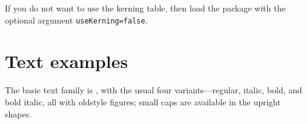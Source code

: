 \documentclass[11pt]{article}
\begin{document}
If you do not want to use the kerning table, then load the package with the optional argument \texttt{useKerning=false}.



\section{Text examples}

\newcommand\demotext{%
  For \textsterling 45, almost anything can
  be found floating in fields. 
  !`THE DAZED BROWN FOX QUICKLY GAVE 12345--67890 JUMPS!
  --- ?`But aren't Kafka's Schlo\ss{} and
  \AE sop's \OE uvres often na\"\i ve vis-\`a-vis the d\ae monic
  ph\oe nix's official r\^ole in fluffy souffl\'es?}

\newcommand*\demotextsc{\textsc{\ Sphinx of black quartz, judge my vow}.}

\newcommand*\otfoldstylenums{\addfontfeatures{Numbers={OldStyle}}}
\newcommand*\demotextosf{\ \otfoldstylenums{0123456789}.}

The basic text family is , with the usual four
variants---\allowbreak regular, italic, bold, and bold italic, all with
oldstyle figures; small caps are available in the upright shapes.
\end{document}
